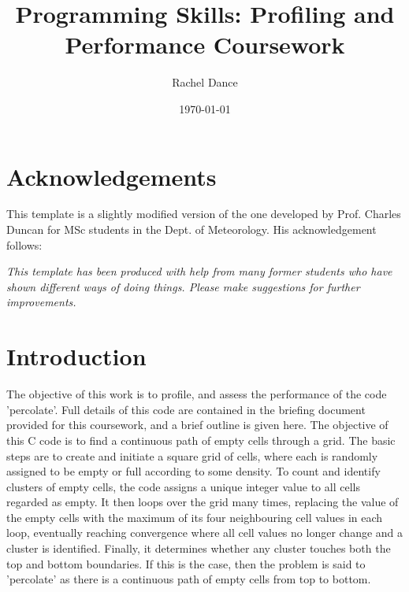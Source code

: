\documentclass[12pt,a4paper]{article}
\begin{document}
\title{Programming Skills: Profiling and Performance Coursework}
\author{Rachel Dance}
\date{\today}

\makeEPCCtitle

\thispagestyle{empty}

\newpage


\tableofcontents

\lstlistoflistings


\section*{Acknowledgements}

This template is a slightly modified version of the one developed by
Prof. Charles Duncan for MSc students in the Dept. of Meteorology. His
acknowledgement follows:

{\em This template has been produced with help from many former students who
have shown different ways of doing things. Please make suggestions for
further improvements.}

\newpage
{}

\section{Introduction}

The objective of this work is to profile, and assess the performance of the code 'percolate'. Full details of this code are contained in the briefing document provided for this coursework, and a brief outline is given here. 
The objective of this C code is to find a continuous path of empty cells through a grid. The basic steps are to create and initiate a square grid of cells, where each is randomly assigned to be empty or full according to some density. To count and identify clusters of empty cells, the code assigns a unique integer value to all cells regarded as empty. It then loops over the grid many times, replacing the value of the empty cells with the maximum of its four neighbouring cell values in each loop, eventually reaching convergence where all cell values no longer change and a cluster is identified. Finally, it determines whether any cluster touches both the top and bottom boundaries. If this is the case, then the problem is said to 'percolate' as there is a continuous path of empty cells from top to bottom.
\end{document}
